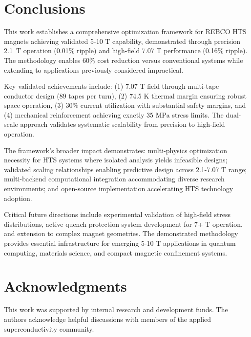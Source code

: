 \documentclass[10pt,twocolumn]{article}
\begin{document}
\section{Conclusions}

This work establishes a comprehensive optimization framework for REBCO HTS magnets achieving validated 5-10 T capability, demonstrated through precision 2.1~T operation (0.01\% ripple) and high-field 7.07 T performance (0.16\% ripple). The methodology enables 60\% cost reduction versus conventional systems while extending to applications previously considered impractical.

Key validated achievements include: (1) 7.07 T field through multi-tape conductor design (89 tapes per turn), (2) 74.5 K thermal margin ensuring robust space operation, (3) 30\% current utilization with substantial safety margins, and (4) mechanical reinforcement achieving exactly 35 MPa stress limits. The dual-scale approach validates systematic scalability from precision to high-field operation.

The framework's broader impact demonstrates: multi-physics optimization necessity for HTS systems where isolated analysis yields infeasible designs; validated scaling relationships enabling predictive design across 2.1-7.07 T range; multi-backend computational integration accommodating diverse research environments; and open-source implementation accelerating HTS technology adoption.

Critical future directions include experimental validation of high-field stress distributions, active quench protection system development for 7+ T operation, and extension to complex magnet geometries. The demonstrated methodology provides essential infrastructure for emerging 5-10 T applications in quantum computing, materials science, and compact magnetic confinement systems.

\section{Acknowledgments}

This work was supported by internal research and development funds. The authors acknowledge helpful discussions with members of the applied superconductivity community.
\end{document}
